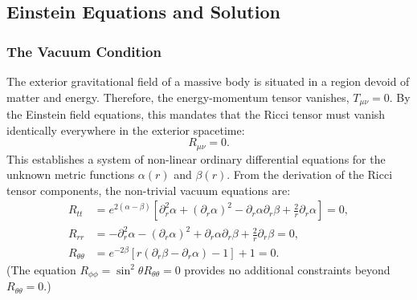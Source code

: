 \documentclass[11pt, a4paper]{report}
\begin{document}

\subsection{Einstein Equations and Solution}

\subsubsection{The Vacuum Condition}
The exterior gravitational field of a massive body is situated in a region devoid of matter and energy. Therefore, the energy-momentum tensor vanishes, $T_{\mu\nu} = 0$. By the Einstein field equations, this mandates that the Ricci tensor must vanish identically everywhere in the exterior spacetime:
\begin{equation}
R_{\mu\nu} = 0.
\end{equation}
This establishes a system of non-linear ordinary differential equations for the unknown metric functions $\alpha(r)$ and $\beta(r)$. From the derivation of the Ricci tensor components, the non-trivial vacuum equations are:
\begin{align}
R_{tt} &= e^{2(\alpha-\beta)} \left[ \partial_r^2\alpha + (\partial_r\alpha)^2 - \partial_r\alpha\partial_r\beta + \frac{2}{r}\partial_r\alpha \right] = 0, \\
R_{rr} &= -\partial_r^2\alpha - (\partial_r\alpha)^2 + \partial_r\alpha\partial_r\beta + \frac{2}{r}\partial_r\beta = 0, \\
R_{\theta\theta} &= e^{-2\beta} \left[ r(\partial_r\beta - \partial_r\alpha) - 1 \right] + 1 = 0.
\end{align}
(The equation $R_{\phi\phi} = \sin^2\theta R_{\theta\theta} = 0$ provides no additional constraints beyond $R_{\theta\theta} = 0$.)
\end{document}
